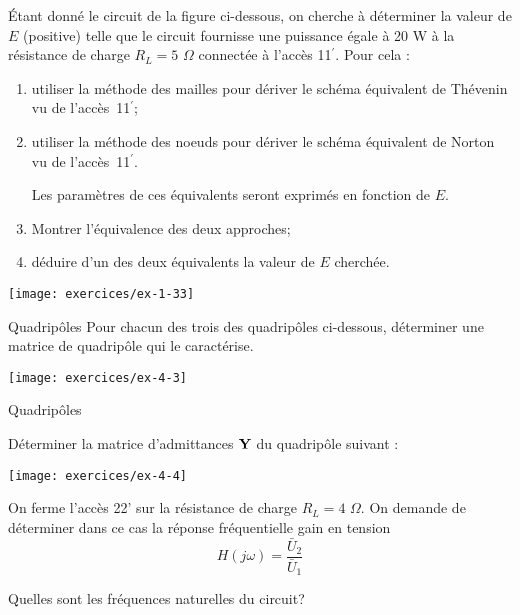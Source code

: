 \begin{exercise}{}\label{ex:mg-16}
Étant donné le circuit de la figure ci-dessous, on cherche à
déterminer la valeur de $E$ (positive) telle que le circuit fournisse
une puissance égale à 20 W à la résistance de charge $R_L=5\,\,
\Omega$ connectée à l'accès 11$^{'}$. Pour cela :

\begin{enumerate}
	\item utiliser la méthode des mailles pour dériver le schéma
	équivalent de Thévenin vu de l'accès~11$^{'}$; 
	\item utiliser la méthode des noeuds pour dériver le schéma
	équivalent de Norton vu de l'accès~11$^{'}$. 
	
	Les paramètres de ces équivalents seront exprimés en fonction de $E$.
	\item Montrer l'équivalence des deux approches;
	\item déduire d'un des deux équivalents la valeur de $E$ cherchée.
\end{enumerate}

\begin{center}
\texttt{[image: exercices/ex-1-33]}
\end{center}

\end{exercise}

\begin{exercise}{Quadripôles}\label{ex:mg-17}
Pour chacun des trois des quadripôles ci-dessous, déterminer une matrice de quadripôle qui le caractérise.
\begin{center}
	\texttt{[image: exercices/ex-4-3]}
\end{center}
\end{exercise}

\begin{exercise}{Quadripôles}\label{ex:mg-18}

Déterminer la matrice d'admittances ${\bf Y}$ du quadripôle suivant : 
\begin{center}
	\texttt{[image: exercices/ex-4-4]}
\end{center}
On ferme l'accès 22' sur la résistance de charge $R_L=4\,\,
\Omega$. On demande de déterminer dans ce cas la réponse fréquentielle 
gain en tension
\[H(j\omega)=\frac{\bar{U}_2}{\bar{U}_1}\]

Quelles sont les fréquences naturelles du circuit?
\end{exercise}


